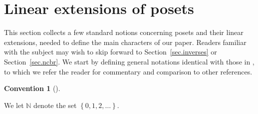 \documentclass[numbers=enddot,12pt,final,onecolumn,notitlepage]{scrartcl}%
\theoremstyle{definition}
\newtheorem{conv}[theo]{Convention}
\newenvironment{convention}[1][]
{\begin{conv}[#1]\begin{leftbar}}
{\end{leftbar}\end{conv}}
\begin{document}
\section{\label{sec.linext}Linear extensions of posets}

This section collects a few standard notions concerning posets and their
linear extensions, needed to define the main characters of our paper. Readers
familiar with the subject may wish to skip forward to
Section~\ref{sec.inverses} or Section~\ref{sec.ncbr}. We start by defining
general notations identical with those in \cite{bir-row-arxiv}, to which we
refer the reader for commentary and comparison to other references.

\begin{convention}
We let $\mathbb{N}$ denote the set $\left\{  0,1,2,\ldots\right\}  $.
\end{convention}
\end{document}
